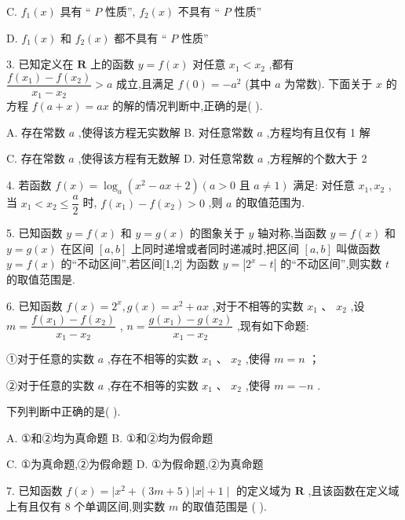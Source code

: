 C. ${f}_{1}\left( x\right)$ 具有 “ $P$ 性质”, ${f}_{2}\left( x\right)$ 不具有 “ $P$ 性质”

D. ${f}_{1}\left( x\right)$ 和 ${f}_{2}\left( x\right)$ 都不具有 “ $P$ 性质”

3. 已知定义在 $\mathbf{R}$ 上的函数 $y = f\left( x\right)$ 对任意 ${x}_{1} < {x}_{2}$ ,都有 $\dfrac{f\left( {x}_{1}\right)  - f\left( {x}_{2}\right) }{{x}_{1} - {x}_{2}} > a$ 成立,且满足 $f\left( 0\right)  =  - {a}^{2}$ (其中 $a$ 为常数). 下面关于 $x$ 的方程 $f\left( {a + x}\right)  = {ax}$ 的解的情况判断中,正确的是(   ).

A. 存在常数 $a$ ,使得该方程无实数解 B. 对任意常数 $a$ ,方程均有且仅有 1 解

C. 存在常数 $a$ ,使得该方程有无数解 D. 对任意常数 $a$ ,方程解的个数大于 2

4. 若函数 $f\left( x\right)  = {\log }_{a}\left( {{x}^{2} - {ax} + 2}\right) \left( {a > 0\text{ 且 }a \neq  1}\right)$ 满足: 对任意 ${x}_{1},{x}_{2}$ ,当 ${x}_{1} < {x}_{2} \leq  \dfrac{a}{2}$ 时, $f\left( {x}_{1}\right)  - f\left( {x}_{2}\right)  > 0$ ,则 $a$ 的取值范围为\blkda{}.

5. 已知函数 $y = f\left( x\right)$ 和 $y = g\left( x\right)$ 的图象关于 $y$ 轴对称,当函数 $y = f\left( x\right)$ 和 $y = g\left( x\right)$ 在区间 $\left\lbrack  {a,b}\right\rbrack$ 上同时递增或者同时递减时,把区间 $\left\lbrack  {a,b}\right\rbrack$ 叫做函数 $y = f\left( x\right)$ 的“不动区间”,若区间[1,2] 为函数 $y = \left| {{2}^{x} - t}\right|$ 的“不动区间”,则实数 $t$ 的取值范围是\blkda{}.

6. 已知函数 $f\left( x\right)  = {2}^{x},g\left( x\right)  = {x}^{2} + {ax}$ ,对于不相等的实数 ${x}_{1}\text{ 、 }{x}_{2}$ ,设 $m = \dfrac{f\left( {x}_{1}\right)  - f\left( {x}_{2}\right) }{{x}_{1} - {x}_{2}}$ , $n = \dfrac{g\left( {x}_{1}\right)  - g\left( {x}_{2}\right) }{{x}_{1} - {x}_{2}}$ ,现有如下命题:

①对于任意的实数 $a$ ,存在不相等的实数 ${x}_{1}\text{ 、 }{x}_{2}$ ,使得 $m = n$ ；

②对于任意的实数 $a$ ,存在不相等的实数 ${x}_{1}\text{ 、 }{x}_{2}$ ,使得 $m =  - n$ .

下列判断中正确的是(   ).

A. ①和②均为真命题 B. ①和②均为假命题

C. ①为真命题,②为假命题 D. ①为假命题,②为真命题

7. 已知函数 $f\left( x\right)  = \mid {x}^{2} + \left( {{3m} + 5}\right) \left| x\right|  + 1 \mid$ 的定义域为 $\mathbf{R}$ ,且该函数在定义域上有且仅有 8 个单调区间,则实数 $m$ 的取值范围是 (   ).

